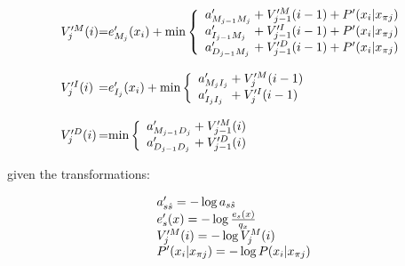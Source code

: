 \documentclass{acm_proc_article-sp}
\begin{document}
\begin{small}
\begin{equation}\label{viterbi-final}
\begin{array}{l@{}c@{}l@{}}
V_{j}^{\prime M}(i) &=& e^{\prime}_{M_{j}}(x_{i}) + \min \left\{
  \begin{array}{l@{}c@{}l}
  \vsum{V_{j-1}^{\prime M}(i-1)} {a^{\prime}_{M_{j-1}M_{j}}} + P'(x_{i}|x_{\pi j})\\
  \vsum{V_{j-1}^{\prime I}(i-1)} {a^{\prime}_{I_{j-1}M_{j}}} + P'(x_{i}|x_{\pi j})\\
  \vsum{V_{j-1}^{\prime D}(i-1)} {a^{\prime}_{D_{j-1}M_{j}}} + P'(x_{i}|x_{\pi j})\\
  \end{array} \right.\\\\
V_{j}^{\prime I}(i) &=& e^{\prime}_{I_{j}}(x_{i}) + \min \left\{
  \begin{array}{l@{}c@{}l}
  \vsum{V_{j}^{\prime M}(i - 1)} {a^{\prime}_{M_{j}I_{j}}}\\
  \vsum{V_{j}^{\prime I}(i - 1)} {a^{\prime}_{I_{j}I_{j}}}\\
  \end{array} \right.\\\\
V_{j}^{\prime D}(i) &=& \min \left\{
  \begin{array}{l@{}c@{}l}
  \vsum{V_{j-1}^{\prime M}(i)} {a^{\prime}_{M_{j-1}D_{j}}}\\
  \vsum{V_{j-1}^{\prime D}(i)} {a^{\prime}_{D_{j-1}D_{j}}}\\
  \end{array} \right.\\
\end{array}
\end{equation}
\end{small}

given the transformations:

\begin{equation}
  \begin{array}{l@{}c@{}l@{}}
  a'_{s \hat{s}} = - \log a_{s \hat{s}} \\
  e^{\prime}_{s}(x) = - \log\frac{e_{s}(x)}{q_{x}}\\
  V_j^{\prime M}(i) = - \log V_j^{M}(i)\\
  P^{\prime}(x_{i}|x_{\pi j}) = - \log P(x_{i}|x_{\pi j})
  \end{array}\\
\end{equation}
\end{document}
